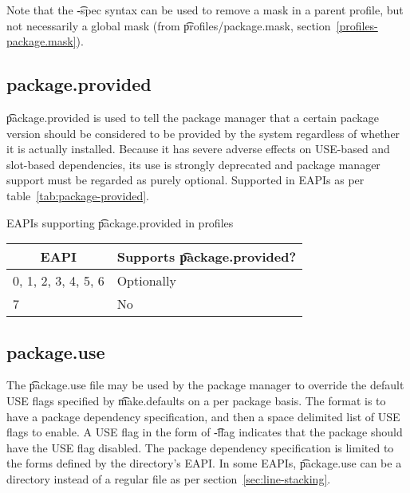 Note that the \t{-spec} syntax can be used to remove a mask in a parent profile, but not
necessarily a global mask (from \t{profiles/package.mask}, section~\ref{profiles-package.mask}).


\subsection{package.provided}
 \t{package.provided} is used to tell the package manager that
a certain package version should be considered to be provided by the system regardless of whether
it is actually installed. Because it has severe adverse effects on USE-based and slot-based
dependencies, its use is strongly deprecated and package manager support must be regarded as purely
optional. Supported in EAPIs as per table~\ref{tab:package-provided}.

\begin{centertable}{EAPIs supporting \t{package.provided} in profiles}
    \label{tab:package-provided}
    \begin{tabular}{ll}
      \toprule
      \multicolumn{1}{c}{\textbf{EAPI}} &
      \multicolumn{1}{c}{\textbf{Supports \t{package.provided}?}} \\
      \midrule
      0, 1, 2, 3, 4, 5, 6 & Optionally \\
      7                   & No         \\
      \bottomrule
    \end{tabular}
\end{centertable}

\subsection{package.use}
The \t{package.use} file may be used by the package manager to override the default USE flags
specified by \t{make.defaults} on a per package basis. The format is to have a package dependency
specification, and then a space delimited list of USE flags to enable. A USE flag in the form of
\t{-flag} indicates that the package should have the USE flag disabled. The package dependency
specification is limited to the forms defined by the directory's EAPI\@. In some EAPIs,
\t{package.use} can be a directory instead of a regular file as per section~\ref{sec:line-stacking}.

